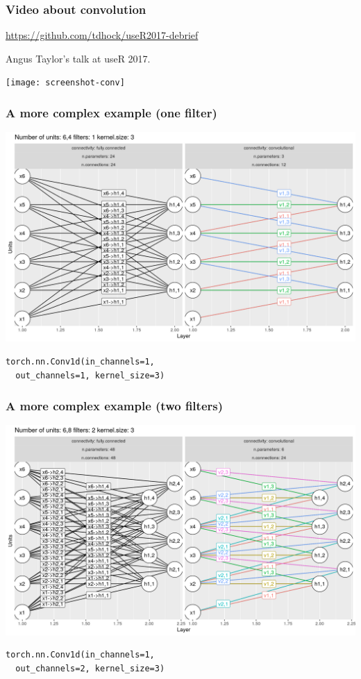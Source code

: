 \documentclass{beamer}
\begin{document}
\begin{frame}
  \frametitle{Video about convolution}
  \url{https://github.com/tdhock/useR2017-debrief}

  Angus Taylor's talk at useR 2017.

  \texttt{[image: screenshot-conv]}
\end{frame}

\begin{frame}
  \frametitle{A more complex example (one filter)}
  \includegraphics[width=\textwidth]{figure-convolutional-filters-6-3-1}

\begin{verbatim}
torch.nn.Conv1d(in_channels=1, 
  out_channels=1, kernel_size=3)
\end{verbatim}
  
\end{frame}

\begin{frame}[fragile]
  \frametitle{A more complex example (two filters)}
  \includegraphics[width=\textwidth]{figure-convolutional-filters-6-3-2}
   
\begin{verbatim}
torch.nn.Conv1d(in_channels=1, 
  out_channels=2, kernel_size=3)
\end{verbatim}
  
\end{frame}
\end{document}
